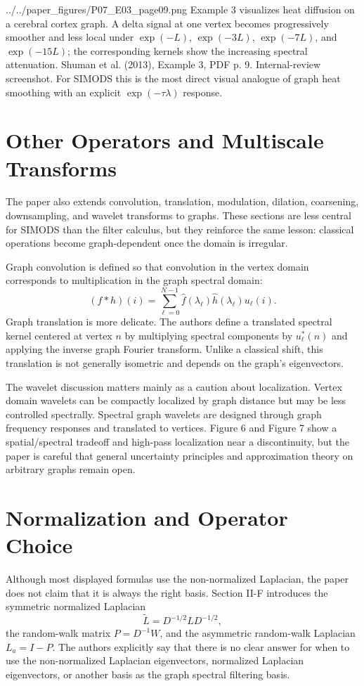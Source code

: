 \documentclass[11pt]{article}
\begin{document}
\paperfigure
  {../../paper_figures/P07_E03_page09.png}
  {Example 3 visualizes heat diffusion on a cerebral cortex graph.  A delta
  signal at one vertex becomes progressively smoother and less local under
  $\exp(-L)$, $\exp(-3L)$, $\exp(-7L)$, and $\exp(-15L)$; the corresponding
  kernels show the increasing spectral attenuation.}
  {Shuman et al. (2013), Example 3, PDF p. 9.}
  {Internal-review screenshot.  For SIMODS this is the most direct visual
  analogue of graph heat smoothing with an explicit $\exp(-\tau\lambda)$
  response.}

\section{Other Operators and Multiscale Transforms}

The paper also extends convolution, translation, modulation, dilation,
coarsening, downsampling, and wavelet transforms to graphs.  These sections
are less central for SIMODS than the filter calculus, but they reinforce the
same lesson: classical operations become graph-dependent once the domain is
irregular.

Graph convolution is defined so that convolution in the vertex domain
corresponds to multiplication in the graph spectral domain:
\[
  (f*h)(i)=\sum_{\ell=0}^{N-1}
  \hat f(\lambda_\ell)\hat h(\lambda_\ell)u_\ell(i).
\]
Graph translation is more delicate.  The authors define a translated spectral
kernel centered at vertex $n$ by multiplying spectral components by
$u_\ell^*(n)$ and applying the inverse graph Fourier transform.  Unlike a
classical shift, this translation is not generally isometric and depends on
the graph's eigenvectors.

The wavelet discussion matters mainly as a caution about localization.  Vertex
domain wavelets can be compactly localized by graph distance but may be less
controlled spectrally.  Spectral graph wavelets are designed through graph
frequency responses and translated to vertices.  Figure 6 and Figure 7 show a
spatial/spectral tradeoff and high-pass localization near a discontinuity, but
the paper is careful that general uncertainty principles and approximation
theory on arbitrary graphs remain open.

\section{Normalization and Operator Choice}

Although most displayed formulas use the non-normalized Laplacian, the paper
does not claim that it is always the right basis.  Section II-F introduces
the symmetric normalized Laplacian
\[
  \widetilde L = D^{-1/2}LD^{-1/2},
\]
the random-walk matrix $P=D^{-1}W$, and the asymmetric random-walk Laplacian
$L_a=I-P$.  The authors explicitly say that there is no clear answer for when
to use the non-normalized Laplacian eigenvectors, normalized Laplacian
eigenvectors, or another basis as the graph spectral filtering basis.
\end{document}
